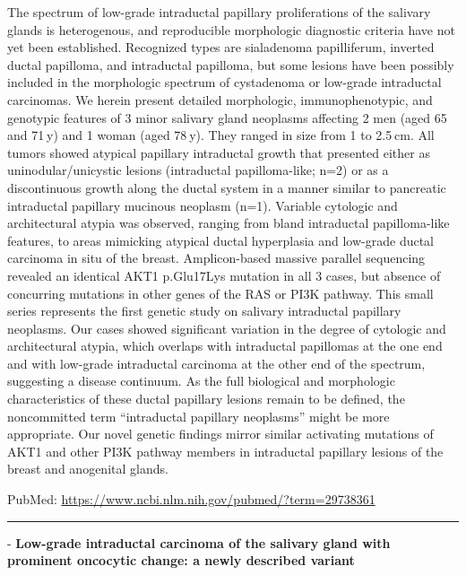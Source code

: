 \documentclass[]{article}
\begin{document}
The spectrum of low-grade intraductal papillary proliferations of the
salivary glands is heterogenous, and reproducible morphologic diagnostic
criteria have not yet been established. Recognized types are sialadenoma
papilliferum, inverted ductal papilloma, and intraductal papilloma, but
some lesions have been possibly included in the morphologic spectrum of
cystadenoma or low-grade intraductal carcinomas. We herein present
detailed morphologic, immunophenotypic, and genotypic features of 3
minor salivary gland neoplasms affecting 2 men (aged 65 and 71 y) and 1
woman (aged 78 y). They ranged in size from 1 to 2.5 cm. All tumors
showed atypical papillary intraductal growth that presented either as
uninodular/unicystic lesions (intraductal papilloma-like; n=2) or as a
discontinuous growth along the ductal system in a manner similar to
pancreatic intraductal papillary mucinous neoplasm (n=1). Variable
cytologic and architectural atypia was observed, ranging from bland
intraductal papilloma-like features, to areas mimicking atypical ductal
hyperplasia and low-grade ductal carcinoma in situ of the breast.
Amplicon-based massive parallel sequencing revealed an identical AKT1
p.Glu17Lys mutation in all 3 cases, but absence of concurring mutations
in other genes of the RAS or PI3K pathway. This small series represents
the first genetic study on salivary intraductal papillary neoplasms. Our
cases showed significant variation in the degree of cytologic and
architectural atypia, which overlaps with intraductal papillomas at the
one end and with low-grade intraductal carcinoma at the other end of the
spectrum, suggesting a disease continuum. As the full biological and
morphologic characteristics of these ductal papillary lesions remain to
be defined, the noncommitted term ``intraductal papillary neoplasms''
might be more appropriate. Our novel genetic findings mirror similar
activating mutations of AKT1 and other PI3K pathway members in
intraductal papillary lesions of the breast and anogenital glands.

PubMed: \url{https://www.ncbi.nlm.nih.gov/pubmed/?term=29738361}

{}

{}

\begin{center}\rule{0.5\linewidth}{\linethickness}\end{center}

 - \textbf{Low-grade intraductal carcinoma of the salivary gland with
prominent oncocytic change: a newly described variant}
\end{document}
